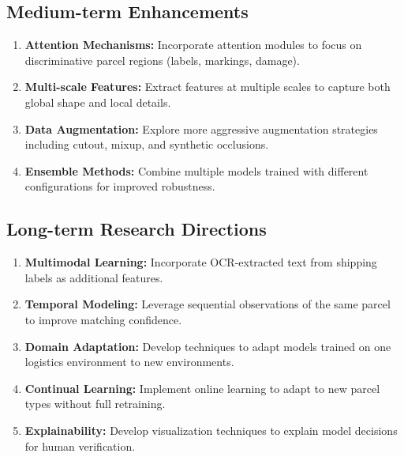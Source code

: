 \documentclass[12pt,a4paper]{article}
\begin{document}
\subsection{Medium-term Enhancements}

\begin{enumerate}
    \item \textbf{Attention Mechanisms:} Incorporate attention modules to focus on discriminative parcel regions (labels, markings, damage).
    
    \item \textbf{Multi-scale Features:} Extract features at multiple scales to capture both global shape and local details.
    
    \item \textbf{Data Augmentation:} Explore more aggressive augmentation strategies including cutout, mixup, and synthetic occlusions.
    
    \item \textbf{Ensemble Methods:} Combine multiple models trained with different configurations for improved robustness.
\end{enumerate}

\subsection{Long-term Research Directions}

\begin{enumerate}
    \item \textbf{Multimodal Learning:} Incorporate OCR-extracted text from shipping labels as additional features.
    
    \item \textbf{Temporal Modeling:} Leverage sequential observations of the same parcel to improve matching confidence.
    
    \item \textbf{Domain Adaptation:} Develop techniques to adapt models trained on one logistics environment to new environments.
    
    \item \textbf{Continual Learning:} Implement online learning to adapt to new parcel types without full retraining.
    
    \item \textbf{Explainability:} Develop visualization techniques to explain model decisions for human verification.
\end{enumerate}
\end{document}
